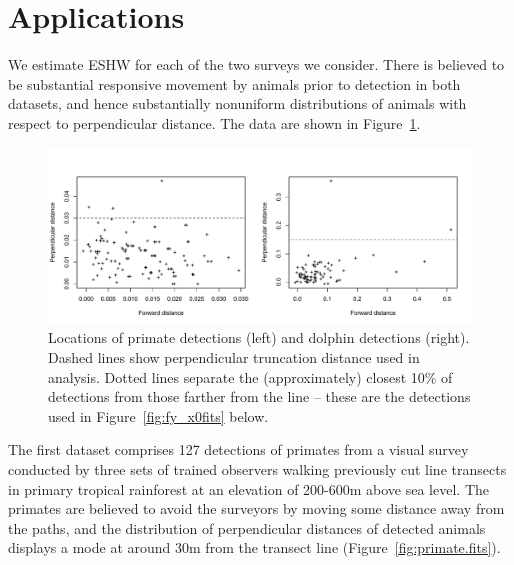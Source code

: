 \documentclass[useAMS,usenatbib,referee]{biom}
\begin{document}
\section{Applications}

We estimate ESHW for each of the two surveys we consider. There is believed to be substantial responsive movement by animals prior to detection in both datasets, and hence substantially nonuniform distributions of animals with respect to perpendicular distance. The data are shown in Figure~\ref{fig:Scatterplots}.

\begin{figure}
\caption{Locations of primate detections (left) and dolphin detections (right). Dashed lines show perpendicular truncation distance used in analysis. Dotted lines separate the (approximately) closest 10\% of detections from those farther from the line -- these are the detections used in Figure~\ref{fig:fy_x0fits} below. \label{fig:Scatterplots}}
\includegraphics[scale=1]{Scatterplots.pdf}
\end{figure}

The first dataset comprises 127 detections of primates from a visual survey conducted by three sets of trained observers walking previously cut line transects in primary tropical rainforest at an elevation of 200-600m above sea level. The primates are believed to avoid the surveyors by moving some distance away from the paths, and the distribution of perpendicular distances of detected animals displays a mode at around 30m from the transect line (Figure~\ref{fig:primate.fits}).
\end{document}
